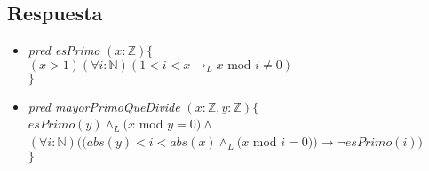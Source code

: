 \documentclass[a4paper]{article}
\begin{document}
\subsection*{Respuesta}

\begin{itemize}
\item \textit{pred esPrimo} $(x: \mathbb{Z})\{$\\
\hspace*{6mm}$(x > 1)(\forall i :\mathbb{N})(1<i<x \rightarrow _L x\textrm{ mod }i\neq 0 )$\\
$\}$


\item \textit{pred mayorPrimoQueDivide} $(x: \mathbb{Z},y: \mathbb{Z})\{$\\
\hspace*{6mm}$esPrimo(y)\wedge _L (x $ mod $y=0)\wedge$\\
\hspace*{6mm}$(\forall i :\mathbb{N})((abs(y)<i<abs(x) \wedge _L(x $ mod $i =0)  )\rightarrow \neg esPrimo(i) )$\\
$\}$
\end{itemize}
\end{document}
